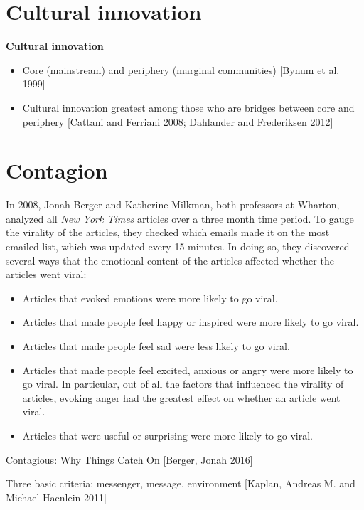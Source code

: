 \documentclass[class=book, crop=false]{standalone}
\providecommand{\keyterm}[1]{\textbf{#1}\marginnote{\scriptsize \textbf{#1}}}
\begin{document}
\section{Cultural innovation}

\keyterm{Cultural innovation}
\begin{itemize}
    \item Core (mainstream) and periphery (marginal communities) [Bynum et al. 1999]
    \item Cultural innovation greatest among those who are bridges between core and periphery [Cattani and Ferriani 2008; Dahlander and Frederiksen 2012]
\end{itemize}

\section{Contagion}

In 2008, Jonah Berger and Katherine Milkman, both professors at Wharton, analyzed all \textit{New York Times} articles over a three month time period. To gauge the virality of the articles, they checked which emails made it on the most emailed list, which was updated every 15 minutes. In doing so, they discovered several ways that the emotional content of the articles affected whether the articles went viral:
\begin{itemize}
    \item Articles that evoked emotions were more likely to go viral.
    \item Articles that made people feel happy or inspired were more likely to go viral.
    \item Articles that made people feel sad were less likely to go viral.
    \item Articles that made people feel excited, anxious or angry were more likely to go viral. In particular, out of all the factors that influenced the virality of articles, evoking anger had the greatest effect on whether an article went viral.
    \item Articles that were useful or surprising were more likely to go viral.
\end{itemize}

Contagious: Why Things Catch On [Berger, Jonah 2016]

Three basic criteria: messenger, message, environment [Kaplan, Andreas M. and Michael Haenlein 2011]
\end{document}

